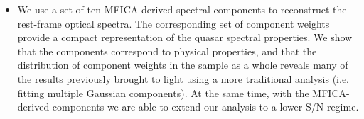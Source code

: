 \begin{itemize}
\item We use a set of ten MFICA-derived spectral components to reconstruct the rest-frame optical spectra. The corresponding set of component weights provide a compact representation of the quasar spectral properties. We show that the components correspond to physical properties, and that the distribution of component weights in the sample as a whole reveals many of the results previously brought to light using a more traditional analysis (i.e. fitting multiple Gaussian components). At the same time, with the MFICA-derived components we are able to extend our analysis to a lower S/N regime. 

\end{itemize}
 


